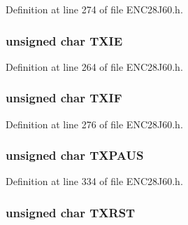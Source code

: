 Definition at line 274 of file E\+N\+C28\+J60.\+h.

\hypertarget{union___r_e_g_a80fc4693b19aa4a89d281b2398660b6b}{}
\subsubsection[{T\+X\+I\+E}]{\setlength{\rightskip}{0pt plus 5cm}unsigned {\bf char} T\+X\+I\+E}\label{union___r_e_g_a80fc4693b19aa4a89d281b2398660b6b}


Definition at line 264 of file E\+N\+C28\+J60.\+h.

\hypertarget{union___r_e_g_a1bc51c72106943f114021c244fb83b2a}{}
\subsubsection[{T\+X\+I\+F}]{\setlength{\rightskip}{0pt plus 5cm}unsigned {\bf char} T\+X\+I\+F}\label{union___r_e_g_a1bc51c72106943f114021c244fb83b2a}


Definition at line 276 of file E\+N\+C28\+J60.\+h.

\hypertarget{union___r_e_g_a44883b5d77e9197805931181928f83c0}{}
\subsubsection[{T\+X\+P\+A\+U\+S}]{\setlength{\rightskip}{0pt plus 5cm}unsigned {\bf char} T\+X\+P\+A\+U\+S}\label{union___r_e_g_a44883b5d77e9197805931181928f83c0}


Definition at line 334 of file E\+N\+C28\+J60.\+h.

\hypertarget{union___r_e_g_ab3107d3e6e3e89c20b5c37199d778721}{}
\subsubsection[{T\+X\+R\+S\+T}]{\setlength{\rightskip}{0pt plus 5cm}unsigned {\bf char} T\+X\+R\+S\+T}\label{union___r_e_g_ab3107d3e6e3e89c20b5c37199d778721}


